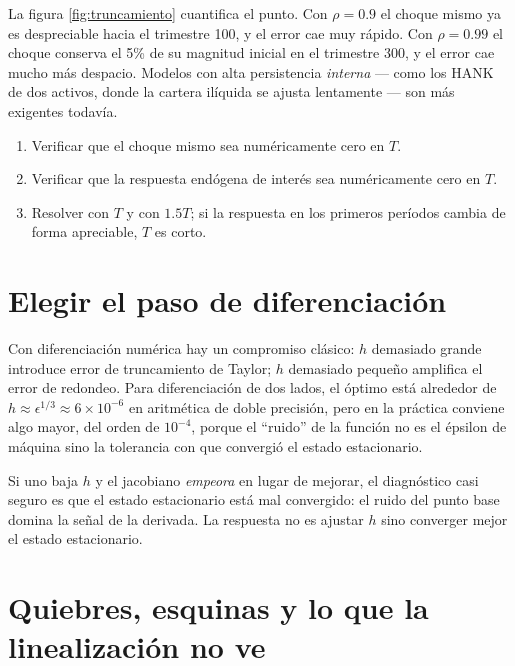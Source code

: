 La figura \ref{fig:truncamiento} cuantifica el punto. Con $\rho=0.9$ el choque
mismo ya es despreciable hacia el trimestre 100, y el error cae muy rápido. Con
$\rho=0.99$ el choque conserva el 5\% de su magnitud inicial en el trimestre
300, y el error cae mucho más despacio. Modelos con alta persistencia
\emph{interna} --- como los HANK de dos activos, donde la cartera ilíquida se
ajusta lentamente --- son más exigentes todavía.

\begin{receta}[Elegir $T$]
\begin{enumerate}[leftmargin=1.4em,itemsep=1pt]
\item Verificar que el choque mismo sea numéricamente cero en $T$.
\item Verificar que la respuesta endógena de interés sea numéricamente cero en
$T$.
\item Resolver con $T$ y con $1.5T$; si la respuesta en los primeros períodos
cambia de forma apreciable, $T$ es corto.
\end{enumerate}
\end{receta}

\section{Elegir el paso de diferenciación}

Con diferenciación numérica hay un compromiso clásico: $h$ demasiado grande
introduce error de truncamiento de Taylor; $h$ demasiado pequeño amplifica el
error de redondeo. Para diferenciación de dos lados, el óptimo está alrededor de
$h \approx \epsilon^{1/3}\approx 6\times10^{-6}$ en aritmética de doble
precisión, pero en la práctica conviene algo mayor, del orden de $10^{-4}$,
porque el ``ruido'' de la función no es el épsilon de máquina sino la tolerancia
con que convergió el estado estacionario.

\begin{trampa}
Si uno baja $h$ y el jacobiano \emph{empeora} en lugar de mejorar, el
diagnóstico casi seguro es que el estado estacionario está mal convergido: el
ruido del punto base domina la señal de la derivada. La respuesta no es ajustar
$h$ sino converger mejor el estado estacionario.
\end{trampa}

\section{Quiebres, esquinas y lo que la linealización no ve}
\label{sec:quiebres}

